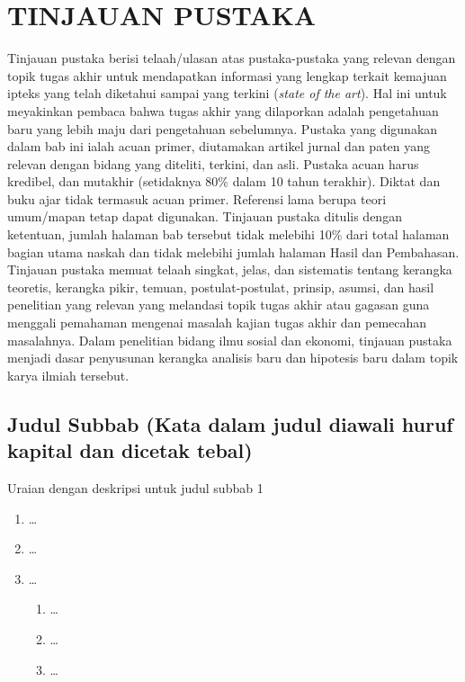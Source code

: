 
\chapter{TINJAUAN PUSTAKA}

Tinjauan pustaka berisi telaah/ulasan atas pustaka-pustaka yang relevan dengan
topik tugas akhir untuk mendapatkan informasi yang lengkap terkait kemajuan
ipteks yang telah diketahui sampai yang terkini (\textit{state of the art}).
Hal ini untuk meyakinkan pembaca bahwa tugas akhir yang dilaporkan adalah
pengetahuan baru yang lebih maju dari pengetahuan sebelumnya. Pustaka yang
digunakan dalam bab ini ialah acuan primer, diutamakan artikel jurnal dan paten
yang relevan dengan bidang yang diteliti, terkini, dan asli. Pustaka acuan harus
kredibel, dan mutakhir (setidaknya 80\% dalam 10 tahun terakhir). Diktat dan
buku ajar tidak termasuk acuan primer. Referensi lama berupa teori umum/mapan
tetap dapat digunakan. Tinjauan pustaka ditulis dengan ketentuan, jumlah halaman
bab tersebut tidak melebihi 10\% dari total halaman bagian utama naskah dan
tidak melebihi jumlah halaman Hasil dan Pembahasan. Tinjauan pustaka memuat
telaah singkat, jelas, dan sistematis tentang kerangka teoretis, kerangka pikir,
temuan, postulat-postulat, prinsip, asumsi, dan hasil penelitian yang relevan
yang melandasi topik tugas akhir atau gagasan guna menggali pemahaman mengenai
masalah kajian tugas akhir dan pemecahan masalahnya. Dalam penelitian bidang
ilmu sosial dan ekonomi, tinjauan pustaka menjadi dasar penyusunan kerangka
analisis baru dan hipotesis baru dalam topik karya ilmiah tersebut.

\section[Judul Subbab]{Judul Subbab (Kata dalam judul diawali huruf kapital dan dicetak tebal)}

Uraian dengan deskripsi untuk judul subbab 1 \dotfill

\noindent\dotfill

\noindent\dotfill

\begin{enumerate}[label=\alph*,leftmargin=0.75cm,labelwidth=0.5cm,
  labelsep=0.25cm,align=left,itemsep=0pt,parsep=0pt,topsep=0pt,partopsep=0pt]
  \item \ldots
  \item \ldots
  \item \ldots
  \begin{enumerate}[label=\arabic*),leftmargin=0.75cm,labelwidth=0.5cm,
    labelsep=0.25cm,align=left,itemsep=0pt,parsep=0pt,topsep=0pt,partopsep=0pt]
    \item \ldots
    \item \ldots
    \item \ldots
  \end{enumerate}
\end{enumerate}

